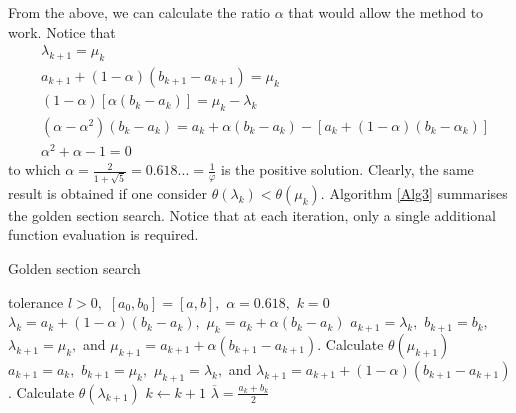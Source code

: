 From the above, we can calculate the ratio $\alpha$ that would allow the method to work. Notice that
\begin{align*}
&\lambda_{k+1} = \mu_k \\
&a_{k+1} + (1-\alpha)(b_{k+1} - a_{k+1})  = \mu_k \\
&(1-\alpha)[\alpha(b_k - a_k)]  = \mu_k - \lambda_k \\
&(\alpha - \alpha^2)(b_k - a_k) = a_k+\alpha(b_k - a_k) - [a_k + (1-\alpha)(b_k - \alpha_k)] \\
&\alpha^2 + \alpha - 1 = 0
\end{align*}
to which $\alpha = \frac{2}{1 + \sqrt{5}} = 0.618... = \frac{1}{\varphi}$ is the positive solution. Clearly, the same result is obtained if one consider $\theta(\lambda_k) < \theta(\mu_k)$. Algorithm \ref{Alg3} summarises the golden section search. Notice that at each iteration, only a single additional function evaluation is required. 
%
\begin{algorithm}[H]
\caption{Golden section search} \label{Alg3}
\begin{algorithmic}[1] %
 tolerance $l > 0,$ $[a_0,b_0] = [a,b],$ $\alpha = 0.618,$ $k = 0$ 
\State $\lambda_k = a_k + (1-\alpha)(b_k - a_k),$ $\mu_k = a_k + \alpha(b_k - a_k)$
    \State $a_{k+1} = \lambda_k,$ $b_{k+1} = b_k,$ $\lambda_{k+1} = \mu_k,$ and
    \State $\mu_{k+1} = a_{k+1} + \alpha (b_{k+1} - a_{k+1})$. Calculate $\theta(\mu_{k+1})$
\Else 
    \State $a_{k+1} = a_k,$ $b_{k+1} = \mu_k,$ $\mu_{k+1} = \lambda_k,$ and
    \State $\lambda_{k+1} = a_{k+1} + (1-\alpha)(b_{k+1} - a_{k+1})$. Calculate $\theta(\lambda_{k+1})$
\EndIf 
\State $k \gets k+1$
\EndWhile
{} $\overline{\lambda} = \frac{a_k + b_k}{2}$
\end{algorithmic}
\end{algorithm}

